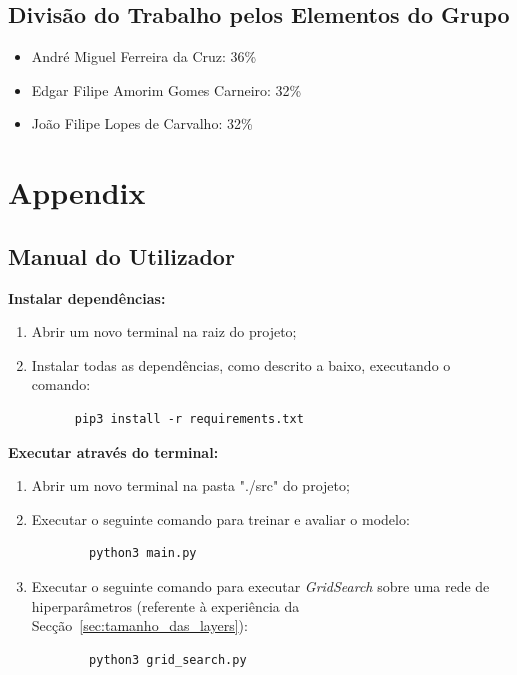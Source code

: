 \documentclass[]{article}
\begin{document}
\subsection{Divisão do Trabalho pelos Elementos do Grupo}
\begin{itemize}
  \item André Miguel Ferreira da Cruz: 36\% %
  \item Edgar Filipe Amorim Gomes Carneiro: 32\% 
  \item João Filipe Lopes de Carvalho: 32\%
\end{itemize}


\newpage

\appendix
\section{Appendix}
\label{sec:appendix}

\subsection{Manual do Utilizador}
\label{sec:manual}
\textbf{Instalar dependências:}
 \begin{enumerate}
  \item Abrir um novo terminal na raiz do projeto;
  \item Instalar todas as dependências, como descrito a baixo, executando o comando:
    \begin{lstlisting}
      pip3 install -r requirements.txt
    \end{lstlisting}
\end{enumerate}

\textbf{Executar através do terminal:}
\begin{enumerate}
	\item Abrir um novo terminal na pasta "./src" do projeto;
  	\item Executar o seguinte comando para treinar e avaliar o modelo:
    \begin{lstlisting}
		python3 main.py
	\end{lstlisting}
    
    \item Executar o seguinte comando para executar \textit{GridSearch} sobre uma rede de hiperparâmetros (referente à experiência da Secção~\ref{sec:tamanho_das_layers}):
    \begin{lstlisting}
		python3 grid_search.py
	\end{lstlisting}
    
\end{enumerate}
  
\end{document}
